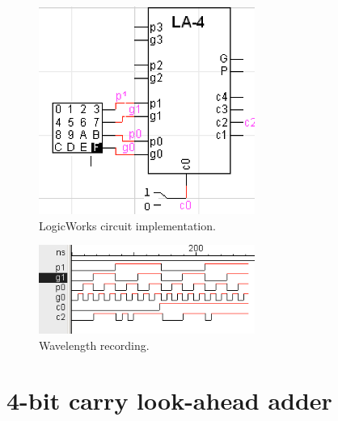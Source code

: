 \documentclass[11pt]{article}
\begin{document}
\begin{enumerate}[(a)]
{		\begin{figure}[h]
			\centering
			\includegraphics[width=200pt]{4ct}
			\caption{\label{fig:4dc} LogicWorks circuit implementation.}
		\end{figure}
		\begin{figure}[h]
			\centering
			\includegraphics[width=200pt]{4t}
			\caption{\label{fig:4dt} Wavelength recording.}
		\end{figure}
	}
\end{enumerate}

\section{4-bit carry look-ahead adder}
\end{document}
